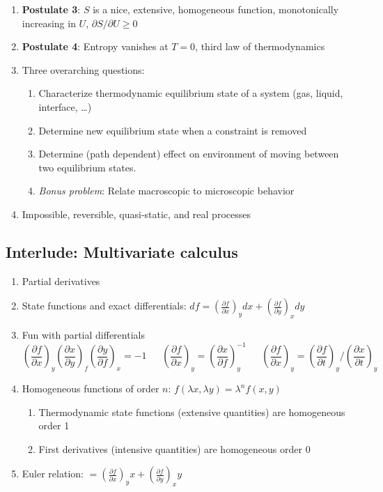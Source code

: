 \documentclass[11pt]{article}
\begin{document}
\begin{enumerate}
\item \textbf{Postulate 3}: \(S\) is a nice, extensive, homogeneous function, monotonically increasing in \(U\), \(\partial S/\partial U \geq 0\)

\item \textbf{Postulate 4}: Entropy vanishes at \(T = 0\), third law of thermodynamics

\item Three overarching questions:
\begin{enumerate}
\item Characterize thermodynamic equilibrium state of a system (gas, liquid, interface, \ldots{})
\item Determine new equilibrium state when a constraint is removed
\item Determine (path dependent) effect on environment of moving between two equilibrium states.
\item \emph{Bonus problem}: Relate macroscopic to microscopic behavior
\end{enumerate}

\item Impossible, reversible, quasi-static, and real processes
\end{enumerate}

\subsection{Interlude: Multivariate calculus}
\label{sec:orgc0a567e}
\begin{enumerate}
\item Partial derivatives
\item State functions and exact differentials: \(df =\left (
       \frac{\partial f}{\partial x} \right )_y dx + \left (
       \frac{\partial f}{\partial y} \right )_x dy\)
\item Fun with partial differentials
\begin{equation*}
 \left ( \frac{\partial f}{\partial x} \right )_y    \left ( \frac{\partial
     x}{\partial y} \right )_f    \left ( \frac{\partial y}{\partial f} \right )_x =
 -1 \ \ \ \ \ \ \    \left ( \frac{\partial f}{\partial x} \right )_y  =   \left (
   \frac{\partial x}{\partial f} \right )_y^{-1}  \ \ \ \ \ \ \    \left (
   \frac{\partial f}{\partial x} \right )_y  =   \left ( \frac{\partial f}{\partial t}
 \right )_y  /   \left ( \frac{\partial x}{\partial t} \right )_y
\end{equation*}

\item Homogeneous functions of order \(n\): \(f(\lambda x, \lambda y ) = \lambda^n f(x,y)\)
\begin{enumerate}
\item Thermodynamic state functions (extensive quantities) are homogeneous order 1
\item First derivatives (intensive quantities) are homogeneous order 0
\end{enumerate}
\item Euler relation: \(=\left (
       \frac{\partial f}{\partial x} \right )_y x + \left (
       \frac{\partial f}{\partial y} \right )_x y\)
\end{enumerate}
\end{document}

